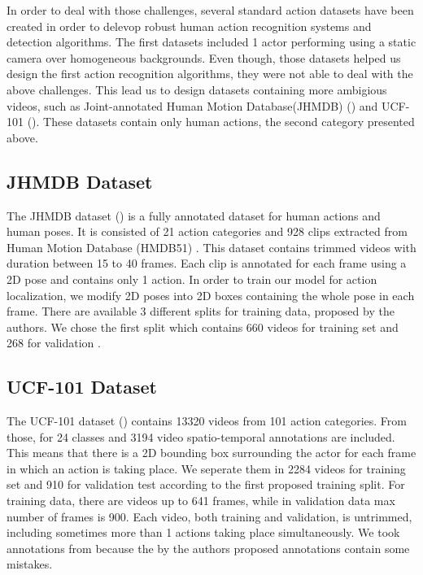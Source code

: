 \documentclass{report}
\begin{document}
In order to deal with those challenges, several standard action datasets have been created in order to delevop
robust human action recognition systems and detection algorithms.
The first datasets included 1 actor performing using a static camera over homogeneous backgrounds.
Even though, those datasets helped us design the first action recognition algorithms, they were not able to deal with the above
challenges.
This lead us to design datasets containing more ambigious videos, such as Joint-annotated Human Motion Database(JHMDB) (\cite{Kuehne11})
and UCF-101 (\cite{soomro2012ucf101}). These datasets contain only human actions, the second category presented above.

\subsection{JHMDB Dataset}
The JHMDB dataset (\cite{Jhuang:ICCV:2013}) is a fully annotated dataset for human actions and human poses. It is consisted of 21 action categories and 928
clips extracted from Human Motion Database (HMDB51) \cite{Kuehne11}. This dataset contains trimmed videos with duration between
15 to 40 frames. Each clip is annotated for each frame using a 2D pose and contains only 1 action.
In order to train our model for action localization, we modify 2D poses into 2D boxes containing the whole pose in each frame.
There are available 3 different splits for training data, proposed by the authors. We chose the first split which contains 660
videos for training set and 268 for validation . 

\subsection{UCF-101 Dataset}
The UCF-101 dataset (\cite{soomro2012ucf101}) contains 13320 videos from 101 action categories.
From those, for 24 classes and 3194 video spatio-temporal annotations are included. This means that there is a 2D bounding box surrounding the actor for each frame in which an action is taking place.
We seperate them in 2284 videos for training set and 910 for validation test according to the
first proposed training split. For training data, there are videos up to 641 frames, while in validation data max number of frames is 900.
Each video, both training and validation, is untrimmed, including sometimes more than 1 actions taking place simultaneously.
We took annotations from
\cite{singh2016online} because the by the authors proposed annotations contain some mistakes.
\end{document}
